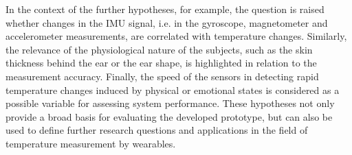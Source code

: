 In the context of the further hypotheses, for example, the question is raised whether changes in the IMU signal, i.e. in the gyroscope, magnetometer and accelerometer measurements, are correlated with temperature changes. Similarly, the relevance of the physiological nature of the subjects, such as the skin thickness behind the ear or the ear shape, is highlighted in relation to the measurement accuracy. 
Finally, the speed of the sensors in detecting rapid temperature changes induced by physical or emotional states is considered as a possible variable for assessing system performance.
These hypotheses not only provide a broad basis for evaluating the developed prototype, but can also be used to define further research questions and applications in the field of temperature measurement by wearables.

